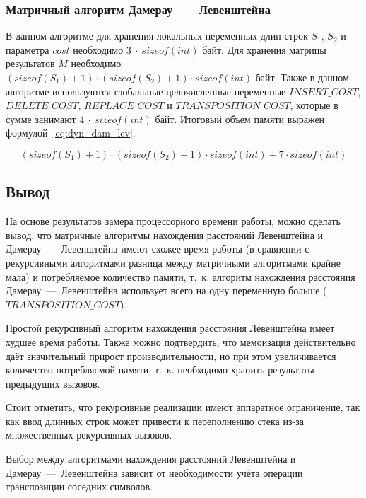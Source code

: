 \subsubsection{Матричный алгоритм Дамерау~---~Левенштейна}

В данном алгоритме для хранения локальных переменных длин строк $S_1$, $S_2$ и параметра $cost$ необходимо $3~\cdot~sizeof(int)$ байт. Для хранения матрицы результатов $M$ необходимо $(sizeof(S_1) + 1) \cdot (sizeof(S_2) + 1) \cdot sizeof(int)$ байт. Также в данном алгоритме используются глобальные целочисленные переменные $INSERT\_COST$, $DELETE\_COST$, $REPLACE\_COST$ и $TRANSPOSITION\_COST$, которые в сумме занимают $4~\cdot~sizeof(int)$ байт. Итоговый объем памяти выражен формулой~\ref{eq:dyn_dam_lev}.

\begin{equation}
    \label{eq:dyn_dam_lev}
    (sizeof(S_1) + 1) \cdot (sizeof(S_2) + 1) \cdot sizeof(int) + 7 \cdot sizeof(int)
\end{equation}

\subsection{Вывод}

На основе результатов замера процессорного времени работы, можно сделать вывод, что матричные алгоритмы нахождения расстояний Левенштейна и Дамерау~---~Левенштейна имеют схожее время работы (в сравнении с рекурсивными алгоритмами разница между матричными алгоритмами крайне мала) и потребляемое количество памяти, т.~к. алгоритм нахождения расстояния Дамерау~---~Левенштейна использует всего на одну переменную больше ($TRANSPOSITION\_COST$). 

Простой рекурсивный алгоритм нахождения расстояния Левенштейна имеет худшее время работы. Также можно подтвердить, что мемоизация действительно даёт значительный прирост производительности, но при этом увеличивается количество потребляемой памяти, т.~к. необходимо хранить результаты предыдущих вызовов. 

Стоит отметить, что рекурсивные реализации имеют аппаратное ограничение, так как ввод длинных строк может привести к переполнению стека из-за множественных рекурсивных вызовов.

Выбор между алгоритмами нахождения расстояний Левенштейна и Дамерау~---~Левенштейна зависит от необходимости учёта операции транспозиции соседних символов.
